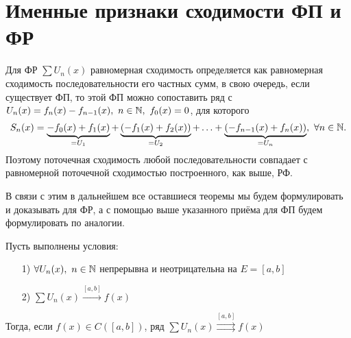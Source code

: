 \documentclass[../../main.tex]{subfiles}
\begin{document}
\section{Именные признаки сходимости ФП и ФР}

Для ФР $\sum U_n(x)$ равномерная сходимость определяется как 
равномерная сходимость последовательности его частных сумм, в свою очередь,
если существует ФП, то этой ФП можно сопоставить ряд с 
$U_n(x) = f_n(x) - f_{n-1}(x),\ n \in \mathbb{N},\ f_0(x) = 0$, для которого
\[
S_n(x) = \underbrace{-f_0(x) + f_1(x)}_{= U_1} + 
\underbrace{(-f_1(x) + f_2(x))}_{= U_2} + \ldots +
\underbrace{(-f_{n-1}(x) + f_n(x))}_{= U_n},\ \forall n \in \mathbb{N}.	
\]
Поэтому поточечная сходимость любой последовательности совпадает с 
равномерной поточечной сходимостью построенного, как выше, РФ.

В связи с этим в дальнейшем все оставшиеся теоремы мы будем формулировать
и доказывать для ФР, а с помощью выше указанного приёма для ФП будем
формулировать по аналогии.

\begin{thm}
Пусть выполнены условия:

	\begin{itemize}
		\item[1)] $\forall U_n(x),\ n \in \mathbb{N}$ непрерывна и неотрицательна на
	$E=[a,b]$
		\item[2)] $\sum U_n(x) \overset{[a,b]}{\longrightarrow} f(x)$
	\end{itemize}
Тогда, если $f(x) \in C([a,b])$, ряд 
$\sum U_n(x) \overset{[a,b]}{\rightrightarrows} f(x)$
\end{thm}	
\end{document}

